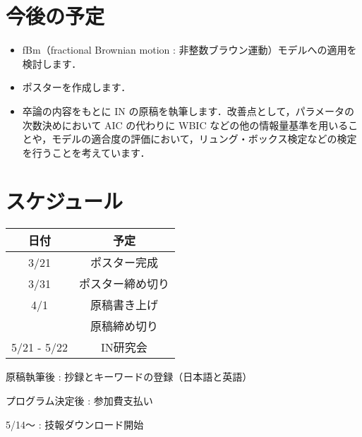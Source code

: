 \documentclass[a4j]{jarticle}
\begin{document}
\section{今後の予定}
\begin{itemize}
\item fBm（fractional Brownian motion : 非整数ブラウン運動）モデルへの適用を検討します．
\item ポスターを作成します．
\item 卒論の内容をもとに IN の原稿を執筆します．改善点として，パラメータの次数決めにおいて AIC の代わりに WBIC などの他の情報量基準を用いることや，モデルの適合度の評価において，リュング・ボックス検定などの検定を行うことを考えています．
\end{itemize}
\section{スケジュール}
\begin{table}[H]
\begin{tabular}{|c|c|}
\hline
日付&予定\\
\hline
3/21&ポスター完成\\
\hline
3/31&ポスター締め切り\\
\hline
4/1&原稿書き上げ\\
\hline
&原稿締め切り\\
\hline
5/21 - 5/22&IN研究会\\
\hline
\end{tabular}
\end{table}
原稿執筆後 : 抄録とキーワードの登録（日本語と英語）

プログラム決定後 : 参加費支払い

5/14～ : 技報ダウンロード開始
\end{document}
